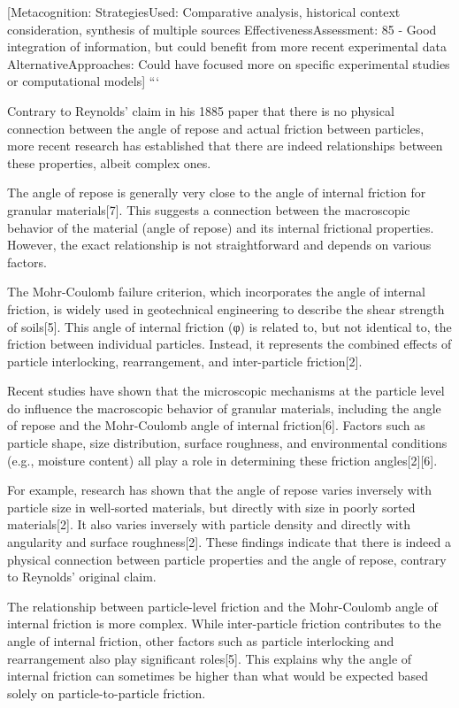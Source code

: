 \documentclass[xcolor=dvipsnames,10pt,hidelinks]{article}
\begin{document}
\begin{itemize}
{[}Metacognition:
StrategiesUsed: Comparative analysis, historical context consideration, synthesis of multiple sources
EffectivenessAssessment: 85 - Good integration of information, but could benefit from more recent experimental data
AlternativeApproaches: Could have focused more on specific experimental studies or computational models]
```

Contrary to Reynolds' claim in his 1885 paper that there is no physical connection between the angle of repose and actual friction between particles, more recent research has established that there are indeed relationships between these properties, albeit complex ones.

The angle of repose is generally very close to the angle of internal friction for granular materials[7]. This suggests a connection between the macroscopic behavior of the material (angle of repose) and its internal frictional properties. However, the exact relationship is not straightforward and depends on various factors.

The Mohr-Coulomb failure criterion, which incorporates the angle of internal friction, is widely used in geotechnical engineering to describe the shear strength of soils[5]. This angle of internal friction (φ) is related to, but not identical to, the friction between individual particles. Instead, it represents the combined effects of particle interlocking, rearrangement, and inter-particle friction[2].

Recent studies have shown that the microscopic mechanisms at the particle level do influence the macroscopic behavior of granular materials, including the angle of repose and the Mohr-Coulomb angle of internal friction[6]. Factors such as particle shape, size distribution, surface roughness, and environmental conditions (e.g., moisture content) all play a role in determining these friction angles[2][6].

For example, research has shown that the angle of repose varies inversely with particle size in well-sorted materials, but directly with size in poorly sorted materials[2]. It also varies inversely with particle density and directly with angularity and surface roughness[2]. These findings indicate that there is indeed a physical connection between particle properties and the angle of repose, contrary to Reynolds' original claim.

The relationship between particle-level friction and the Mohr-Coulomb angle of internal friction is more complex. While inter-particle friction contributes to the angle of internal friction, other factors such as particle interlocking and rearrangement also play significant roles[5]. This explains why the angle of internal friction can sometimes be higher than what would be expected based solely on particle-to-particle friction.


\end{itemize}
\end{document}
